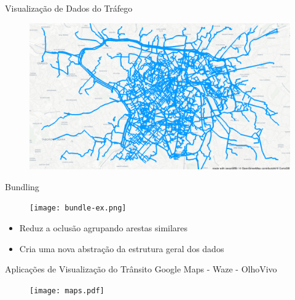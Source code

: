 \begin{frame}{Visualização de Dados do Tráfego}
  \begin{figure}[!htb]
    \centering
    \includegraphics[width=\textwidth]{../figuras/trafego-ocluso.png}
  \end{figure}
\end{frame}




{
\begin{frame}{Bundling}
  \begin{figure}[!htb]
    \centering
    \texttt{[image: bundle-ex.png]}
  \end{figure}

  \pause
  \begin{itemize}
    \item Reduz a oclusão agrupando arestas similares
    \item Cria uma nova abstração da estrutura geral dos dados
  \end{itemize}
\end{frame}
}

\begin{frame}{Aplicações de Visualização do Trânsito}
  \centering
  Google Maps - Waze - OlhoVivo
  \begin{figure}[!htb]
    \centering
    \texttt{[image: maps.pdf]}
  \end{figure}
 \end{frame}

